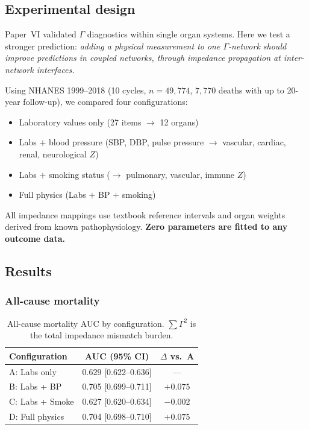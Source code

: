 \documentclass[aps,pre,twocolumn,superscriptaddress,floatfix]{revtex4-2}
\begin{document}
\subsection{Experimental design}

Paper~VI validated $\Gamma$ diagnostics within single
organ systems.  Here we test a stronger prediction:
\emph{adding a physical measurement to one $\Gamma$-network
should improve predictions in coupled networks, through
impedance propagation at inter-network interfaces.}

Using NHANES 1999--2018 (10 cycles, $n = 49{,}774$,
$7{,}770$ deaths with up to 20-year follow-up), we
compared four configurations:
\begin{itemize}
  \item[A] Laboratory values only (27 items $\to$ 12 organs)
  \item[B] Labs $+$ blood pressure
    (SBP, DBP, pulse pressure $\to$ vascular, cardiac,
     renal, neurological $Z$)
  \item[C] Labs $+$ smoking status
    ($\to$ pulmonary, vascular, immune $Z$)
  \item[D] Full physics (Labs $+$ BP $+$ smoking)
\end{itemize}

All impedance mappings use textbook reference intervals
and organ weights derived from known pathophysiology.
\textbf{Zero parameters are fitted to any outcome data.}

\subsection{Results}

\subsubsection{All-cause mortality}

\begin{table}[h]
\centering
\caption{All-cause mortality AUC by configuration.
$\sum\Gamma^2$ is the total impedance mismatch burden.}
\label{tab:allcause}
\begin{tabular}{lcc}
\toprule
Configuration & AUC (95\% CI) & $\Delta$ vs.\ A \\
\midrule
A: Labs only    & 0.629 [0.622--0.636] & --- \\
B: Labs + BP    & 0.705 [0.699--0.711] & $+0.075$ \\
C: Labs + Smoke & 0.627 [0.620--0.634] & $-0.002$ \\
D: Full physics & 0.704 [0.698--0.710] & $+0.075$ \\
\bottomrule
\end{tabular}
\end{table}
\end{document}
